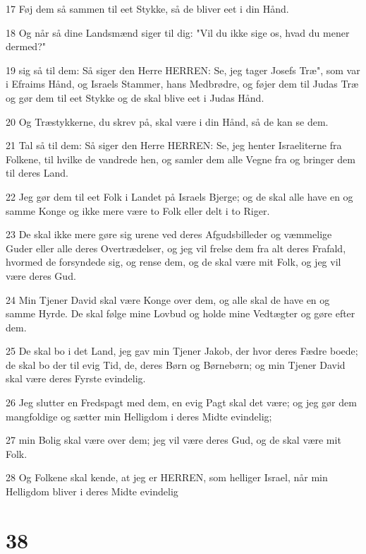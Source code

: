 \par 17 Føj dem så sammen til eet Stykke, så de bliver eet i din Hånd.
\par 18 Og når så dine Landsmænd siger til dig: "Vil du ikke sige os, hvad du mener dermed?"
\par 19 sig så til dem: Så siger den Herre HERREN: Se, jeg tager Josefs Træ", som var i Efraims Hånd, og Israels Stammer, hans Medbrødre, og føjer dem til Judas Træ og gør dem til eet Stykke og de skal blive eet i Judas Hånd.
\par 20 Og Træstykkerne, du skrev på, skal være i din Hånd, så de kan se dem.
\par 21 Tal så til dem: Så siger den Herre HERREN: Se, jeg henter Israeliterne fra Folkene, til hvilke de vandrede hen, og samler dem alle Vegne fra og bringer dem til deres Land.
\par 22 Jeg gør dem til eet Folk i Landet på Israels Bjerge; og de skal alle have en og samme Konge og ikke mere være to Folk eller delt i to Riger.
\par 23 De skal ikke mere gøre sig urene ved deres Afgudsbilleder og væmmelige Guder eller alle deres Overtrædelser, og jeg vil frelse dem fra alt deres Frafald, hvormed de forsyndede sig, og rense dem, og de skal være mit Folk, og jeg vil være deres Gud.
\par 24 Min Tjener David skal være Konge over dem, og alle skal de have en og samme Hyrde. De skal følge mine Lovbud og holde mine Vedtægter og gøre efter dem.
\par 25 De skal bo i det Land, jeg gav min Tjener Jakob, der hvor deres Fædre boede; de skal bo der til evig Tid, de, deres Børn og Børnebørn; og min Tjener David skal være deres Fyrste evindelig.
\par 26 Jeg slutter en Fredspagt med dem, en evig Pagt skal det være; og jeg gør dem mangfoldige og sætter min Helligdom i deres Midte evindelig;
\par 27 min Bolig skal være over dem; jeg vil være deres Gud, og de skal være mit Folk.
\par 28 Og Folkene skal kende, at jeg er HERREN, som helliger Israel, når min Helligdom bliver i deres Midte evindelig

\chapter{38}

